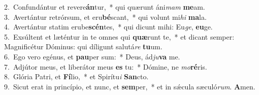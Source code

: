 {2.~}Confundántur et revere\textbf{án}tur,~* qui quærunt áni\textit{mam} \textbf{me}am.\\
{3.~}Avertántur retrórsum, et eru\textbf{bé}scant,~* qui volunt mi\textit{hi} \textbf{ma}la.\\
{4.~}Avertántur statim erube\textbf{scén}tes,~* qui dicunt mihi: Eu\textit{ge}, \textbf{e}\textbf{u}ge.\\
{5.~}Exsúltent et læténtur in te omnes qui \textbf{quæ}runt te,~* et dicant semper: Magnificétur Dóminus: qui díligunt salutá\textit{re} \textbf{tu}um.\\
{6.~}Ego vero egénus, et \textbf{pau}per sum:~* Deus, ád\textit{ju}\textbf{va} me.\\
{7.~}Adjútor meus, et liberátor meus \textbf{es} tu:~* Dómine, ne \textit{mo}\textbf{ré}ris.\\
{8.~}Glória Patri, et \textbf{Fí}lio,~* et Spirítu\textit{i} \textbf{San}cto.\\
{9.~}Sicut erat in princípio, et nunc, et \textbf{sem}per,~* et in sǽcula sæculó\textit{rum}. \textbf{A}men.\\
